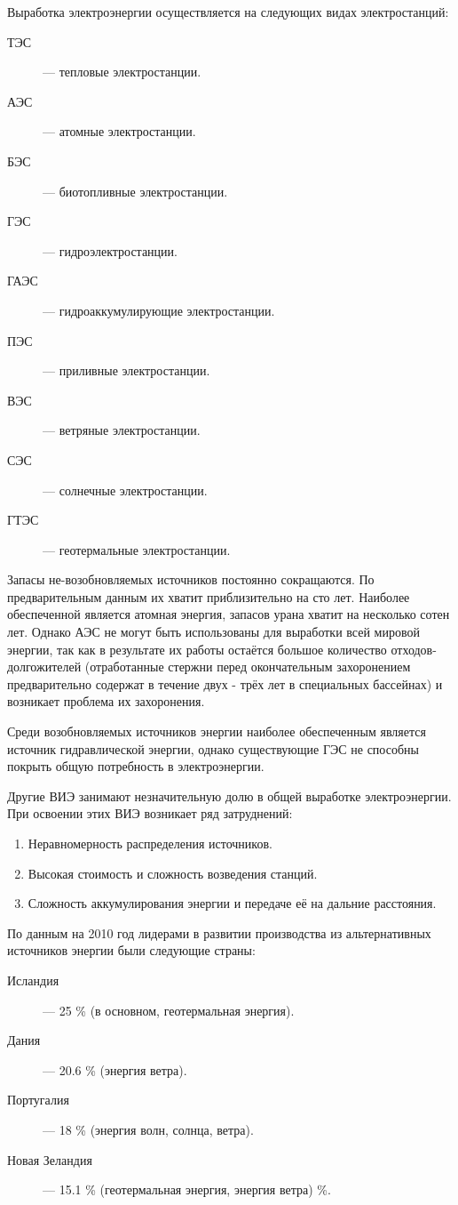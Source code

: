 \vspace{0.5cm}

Выработка электроэнергии осуществляется на следующих видах электростанций:
\begin{description}
\item[ТЭС] --- тепловые электростанции.
\item[АЭС] --- атомные электростанции.
\item[БЭС] --- биотопливные электростанции.
\item[ГЭС] --- гидроэлектростанции.
\item[ГАЭС] --- гидроаккумулирующие электростанции.
\item[ПЭС] --- приливные электростанции.
\item[ВЭС] --- ветряные электростанции.
\item[СЭС] --- солнечные электростанции.
\item[ГТЭС] --- геотермальные электростанции.
\end{description}


Запасы не-возобновляемых источников постоянно сокращаются. По предварительным данным их хватит приблизительно на сто лет. Наиболее обеспеченной является атомная энергия, запасов урана хватит на несколько сотен лет. Однако АЭС не могут быть использованы для выработки всей мировой энергии, так как в результате их работы остаётся большое количество отходов-долгожителей (отработанные стержни перед окончательным захоронением предварительно содержат в течение двух - трёх лет в специальных бассейнах) и возникает проблема их захоронения. 

Среди возобновляемых источников энергии наиболее обеспеченным является источник гидравлической энергии, однако существующие ГЭС не способны покрыть общую потребность в электроэнергии. 

Другие ВИЭ занимают незначительную долю в общей выработке электроэнергии. При освоении этих ВИЭ возникает ряд затруднений:
\begin{enumerate}
\item Неравномерность распределения источников. 
\item Высокая стоимость и сложность возведения станций.
\item Сложность аккумулирования энергии и передаче её на дальние расстояния.
\end{enumerate}

По данным на 2010 год лидерами в развитии производства из альтернативных источников энергии были следующие страны:
\begin{description}
\item[Исландия] --- 25 \% (в основном, геотермальная энергия).
\item[Дания] --- 20.6 \% (энергия ветра).
\item[Португалия] --- 18 \% (энергия волн, солнца, ветра).
\item[Новая Зеландия] --- 15.1 \% (геотермальная энергия, энергия ветра) \%.
\end{description}

